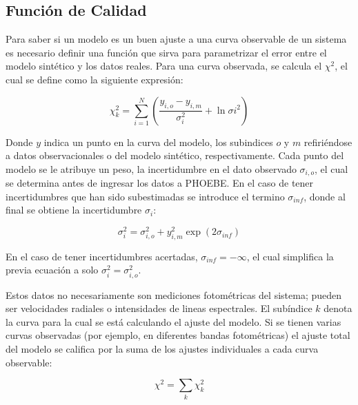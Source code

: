 \subsection{Función de Calidad}

Para saber si un modelo es un buen ajuste a una curva observable de un sistema
es necesario definir una función que sirva para parametrizar el error entre el
modelo sintético y los datos reales. Para una curva observada, se calcula el
$\chi^2$, el cual se define como la siguiente expresión:

\begin{eqfloat}[!ht]
	\centering
	\begin{equation}
		\chi_{k}^2 = \sum_{i=1}^{N}{\left(\frac{y_{i,o} - y_{i,m}}{\sigma_{i}^2} + \ln{\sigma{i}^2}\right)}
	\end{equation}
	\blankcaption
	\label{ecuacionPhoebeChi2Curva}
\end{eqfloat}

Donde $y$ indica un punto en la curva del modelo, los subindices $o$ y $m$
refiriéndose a datos observacionales o del modelo sintético, respectivamente.
Cada punto del modelo se le atribuye un peso, la incertidumbre en el dato
observado $\sigma_{i,o}$, el cual se determina antes de ingresar los datos a
PHOEBE. En el caso de tener incertidumbres que han sido subestimadas se
introduce el termino $\sigma_{inf}$, donde al final se obtiene la incertidumbre
$\sigma_{i}$:

\begin{eqfloat}[!ht]
	\centering
	\begin{equation}
		\sigma_{i}^{2} = \sigma_{i,o}^{2} + y_{i,m}^{2} \exp{\left(2 \sigma_{inf}\right)}
	\end{equation}
\end{eqfloat}

En el caso de tener incertidumbres acertadas, $\sigma_{inf} = -\infty$, el cual
simplifica la previa ecuación a solo $\sigma_{i}^{2} = \sigma_{i,o}^{2}$.

Estos datos no necesariamente son mediciones fotométricas del sistema; pueden
ser velocidades radiales o intensidades de lineas espectrales. El subíndice $k$
denota la curva para la cual se está calculando el ajuste del modelo. Si se
tienen varias curvas observadas (por ejemplo, en diferentes bandas fotométricas)
el ajuste total del modelo se califica por la suma de los ajustes individuales a
cada curva observable:

\begin{eqfloat}[!ht]
	\centering
	\begin{equation}
		\chi^2 = \sum_{k}{\chi_{k}^{2}}
	\end{equation}
	\blankcaption
	\vspace{-0.4em}
	\label{ecuacionChi2}
\end{eqfloat}

